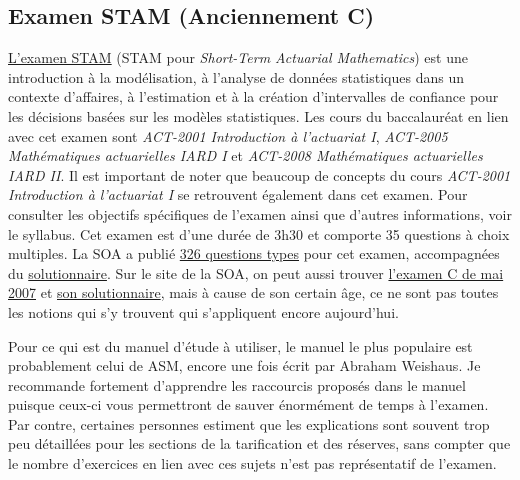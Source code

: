 \subsection*{Examen STAM (Anciennement C)}
\label{subsec:examstam}
\href{https://www.soa.org/Education/Exam-Req/edu-exam-stam-detail.aspx}{L'examen STAM} (STAM pour \textit{Short-Term Actuarial Mathematics}) est une introduction à la modélisation, à l'analyse de données statistiques dans un contexte d'affaires, à l'estimation et à la création d'intervalles de confiance pour les décisions basées sur les modèles statistiques. Les cours du baccalauréat en lien avec cet examen sont \textit{ACT-2001 Introduction à l'actuariat I}, \textit{ACT-2005 Mathématiques actuarielles IARD I} et \textit{ACT-2008 Mathématiques actuarielles IARD II}. Il est important de noter que beaucoup de concepts du cours \textit{ACT-2001 Introduction à l'actuariat I} se retrouvent également dans cet examen. Pour consulter les objectifs spécifiques de l'examen ainsi que d'autres informations, voir le syllabus. Cet examen est d'une durée de 3h30 et comporte 35 questions à choix multiples. La SOA a publié \href{https://www.soa.org/Files/Edu/2018/2018-04-exam-stam-questions.pdf}{326 questions types} pour cet examen, accompagnées du \href{https://www.soa.org/Files/Edu/2018/2018-04-exam-stam-solutions.pdf}{solutionnaire}. Sur le site de la SOA, on peut aussi trouver \href{https://www.soa.org/files/edu/edu-mc-exam-c-0507.pdf}{l'examen C de mai 2007} et \href{https://www.soa.org/files/edu/edu-exam-c-0507-sol.pdf}{son solutionnaire}, mais à cause de son certain âge, ce ne sont pas toutes les notions qui s'y trouvent qui s'appliquent encore aujourd'hui. \vspace{\baselineskip}

Pour ce qui est du manuel d'étude à utiliser, le manuel le plus populaire est probablement celui de ASM, encore une fois écrit par Abraham Weishaus. Je recommande fortement d'apprendre les raccourcis proposés dans le manuel puisque ceux-ci vous permettront de sauver énormément de temps à l'examen. Par contre, certaines personnes estiment que les explications sont souvent trop peu détaillées pour les sections de la tarification et des réserves, sans compter que le nombre d'exercices en lien avec ces sujets n'est pas représentatif de l'examen. \vspace{\baselineskip}

